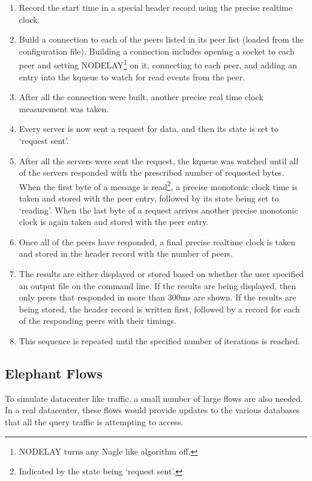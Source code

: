 \documentclass[12pt]{article}
\begin{document}
\begin{enumerate}

\item Record the start time in a special header record using the precise realtime clock.

\item Build a connection to each of the peers listed in its peer list (loaded from the configuration
file). Building a connection includes opening a socket to each peer and setting NODELAY\footnote{NODELAY turns 
any Nagle\cite{rfc896} like algorithm off.} on it, connecting to each peer, and adding an entry into 
the kqueue to watch for read events from the peer.

\item After all the connection were built, another precise real time clock measurement was
taken.

\item Every server is now sent a request for data, and then its state is set to `request sent'.

\item After all the servers were sent the request, the kqueue was watched until all of the servers
responded with the prescribed number of  requested bytes. When the first byte of a
message is read\footnote{Indicated by the state being `request
  sent'.}, a precise monotonic clock time
is taken and stored with the peer entry, followed by its state being set to `reading'. When the last byte of a request arrives another 
precise monotonic clock is again taken and stored with the peer entry.

\item Once all of the peers have responded, a final precise realtime clock is taken and stored
in the header record with the number of peers.

\item The results are either displayed or stored based on
whether the user specified an output file on the command line. If the results are being
displayed, then only peers that responded in more than 300ms are shown.
If the results are being stored, the header record is written first, followed by a record for each of the
responding peers with their timings.

\item This sequence is repeated until the specified number of iterations is reached.

\end{enumerate}

\subsection{Elephant Flows}
\label{elephants}
To simulate datacenter like traffic, a small number of large flows are also needed. In a
real datacenter, these flows would provide updates to the various databases that all the query traffic is attempting to access. 
\end{document}
